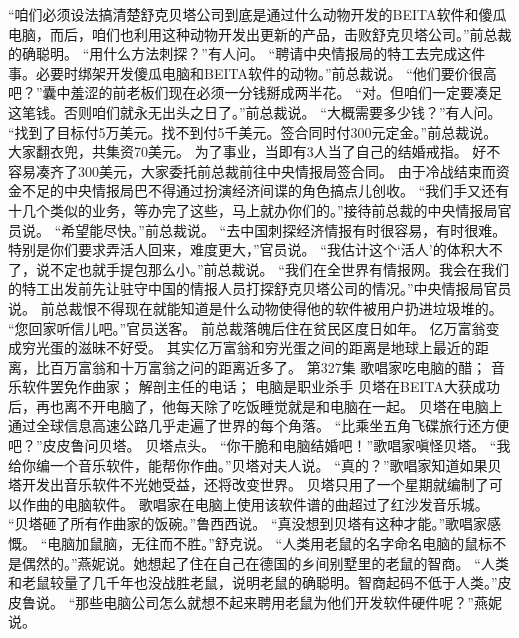 \documentclass[a4paper,12pt,UTF8,twoside]{ctexbook}
\begin{document}
        “咱们必须设法搞清楚舒克贝塔公司到底是通过什么动物开发的BEITA软件和傻瓜电脑，而后，咱们也利用这种动物开发出更新的产品，击败舒克贝塔公司。”前总裁的确聪明。  
        “用什么方法刺探？”有人问。  
        “聘请中央情报局的特工去完成这件事。必要时绑架开发傻瓜电脑和BEITA软件的动物。”前总裁说。  
        “他们要价很高吧？”囊中羞涩的前老板们现在必须一分钱掰成两半花。  
        “对。但咱们一定要凑足这笔钱。否则咱们就永无出头之日了。”前总裁说。  
        “大概需要多少钱？”有人问。  
        “找到了目标付5万美元。找不到付5千美元。签合同时付300元定金。”前总裁说。  
        大家翻衣兜，共集资70美元。  
        为了事业，当即有3人当了自己的结婚戒指。  
        好不容易凑齐了300美元，大家委托前总裁前往中央情报局签合同。  
        由于冷战结束而资金不足的中央情报局巴不得通过扮演经济间谍的角色搞点儿创收。  
        “我们手又还有十几个类似的业务，等办完了这些，马上就办你们的。”接待前总裁的中央情报局官员说。  
        “希望能尽快。”前总裁说。  
        “去中国刺探经济情报有时很容易，有时很难。特别是你们要求弄活人回来，难度更大，”官员说。  
        “我估计这个‘活人’的体积大不了，说不定也就手提包那么小。”前总裁说。  
        “我们在全世界有情报网。我会在我们的特工出发前先让驻守中国的情报人员打探舒克贝塔公司的情况。”中央情报局官员说。  
        前总裁恨不得现在就能知道是什么动物使得他的软件被用户扔进垃圾堆的。  
        “您回家听信儿吧。”官员送客。  
        前总裁落魄后住在贫民区度日如年。  
        亿万富翁变成穷光蛋的滋昧不好受。  
        其实亿万富翁和穷光蛋之间的距离是地球上最近的距离，比百万富翁和十万富翁之问的距离近多了。          第327集  
        歌唱家吃电脑的醋；  
        音乐软件罢免作曲家；  
        解剖主任的电话；  
        电脑是职业杀手    
        贝塔在BEITA大获成功后，再也离不开电脑了，他每天除了吃饭睡觉就是和电脑在一起。  
        贝塔在电脑上通过全球信息高速公路几乎走遍了世界的每个角落。  
        “比乘坐五角飞碟旅行还方便吧？”皮皮鲁问贝塔。  
        贝塔点头。  
        “你干脆和电脑结婚吧！”歌唱家嗔怪贝塔。  
        “我给你编一个音乐软件，能帮你作曲。”贝塔对夫人说。  
        “真的？”歌唱家知道如果贝塔开发出音乐软件不光她受益，还将改变世界。  
        贝塔只用了一个星期就编制了可以作曲的电脑软件。  
        歌唱家在电脑上使用该软件谱的曲超过了红沙发音乐城。  
        “贝塔砸了所有作曲家的饭碗。”鲁西西说。  
        “真没想到贝塔有这种才能。”歌唱家感慨。  
        “电脑加鼠脑，无往而不胜。”舒克说。  
        “人类用老鼠的名字命名电脑的鼠标不是偶然的。”燕妮说。她想起了住在自己在德国的乡间别墅里的老鼠的智商。  
        “人类和老鼠较量了几千年也没战胜老鼠，说明老鼠的确聪明。智商起码不低于人类。”皮皮鲁说。  
        “那些电脑公司怎么就想不起来聘用老鼠为他们开发软件硬件呢？”燕妮说。  
\end{document}
